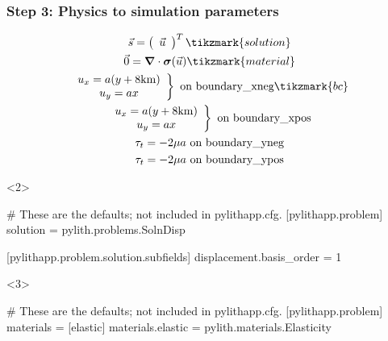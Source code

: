 \documentclass[aspectratio=169]{beamer}
\begin{document}
\begin{frame}[t,fragile]
  \frametitle{Step 3: Physics to simulation parameters}
  \summary{}

  \begin{minipage}[t]{0.35\textwidth}
    {\scriptsize
    \begin{gather*}
      \vec{s} = \left(\begin{array}{c} \vec{u} \end{array}\right)^T \tikzmark{solution}\\
      \vec{0} = \boldsymbol{\nabla} \cdot \boldsymbol{\sigma}(\vec{u}) \tikzmark{material}\\
      \left. \begin{array}{c} u_x = a(y+8\mathrm{km}) \\ u_y = ax \end{array}\right\} \text{ on boundary\_xneg} \tikzmark{bc} \\
      \left. \begin{array}{c} u_x = a(y+8\mathrm{km}) \\ u_y = ax \end{array}\right\} \text{ on boundary\_xpos} \\
      \tau_t = -2\mu a \text{ on boundary\_yneg} \\
      \tau_t = -2\mu a \text{ on boundary\_ypos}
    \end{gather*}}
  \end{minipage}
  \hfill
  \begin{minipage}[t]{0.60\textwidth}
    \begin{onlyenv}<2>
      \begin{cfgcode}
        # These are the defaults; not included in pylithapp.cfg.
        [pylithapp.problem]
        solution = pylith.problems.SolnDisp
        
        [pylithapp.problem.solution.subfields]
        displacement.basis_order = 1
      \end{cfgcode}
    \end{onlyenv}
    \begin{onlyenv}<3>
      \begin{cfgcode}
        # These are the defaults; not included in pylithapp.cfg.
        [pylithapp.problem]
        materials = [elastic]
        materials.elastic = pylith.materials.Elasticity


\end{cfgcode}
\end{onlyenv}
\end{minipage}
\end{frame}
\end{document}

